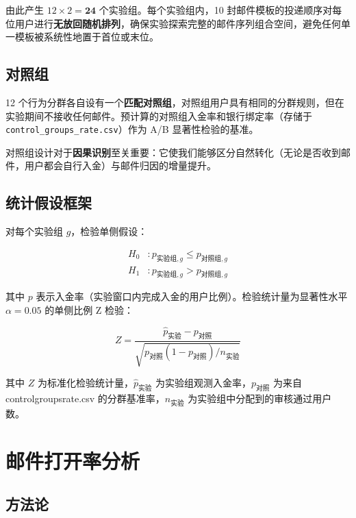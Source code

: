 \documentclass[12pt,a4paper]{ctexart}
\newcommand{\colname}[1]{{\ttfamily\renewcommand{\_}{\textunderscore\allowbreak}#1}}
\begin{document}
由此产生 $12 \times 2 = \mathbf{24}$ 个实验组。每个实验组内，10 封邮件模板的投递顺序对每位用户进行\textbf{无放回随机排列}，确保实验探索完整的邮件序列组合空间，避免任何单一模板被系统性地置于首位或末位。

\subsection{对照组}

12 个行为分群各自设有一个\textbf{匹配对照组}，对照组用户具有相同的分群规则，但在实验期间不接收任何邮件。预计算的对照组入金率和银行绑定率（存储于 \texttt{control\_groups\_rate.csv}）作为 A/B 显著性检验的基准。

对照组设计对于\textbf{因果识别}至关重要：它使我们能够区分自然转化（无论是否收到邮件，用户都会自行入金）与邮件归因的增量提升。

\subsection{统计假设框架}

对每个实验组 $g$，检验单侧假设：

\begin{align}
  H_0 &: p_{\text{实验组},g} \leq p_{\text{对照组},g} \\
  H_1 &: p_{\text{实验组},g} > p_{\text{对照组},g}
\end{align}

其中 $p$ 表示入金率（实验窗口内完成入金的用户比例）。检验统计量为显著性水平 $\alpha = 0.05$ 的单侧比例 Z 检验：

\begin{equation}
  Z = \frac{\hat{p}_{\text{实验}} - p_{\text{对照}}}%
      {\sqrt{p_{\text{对照}}(1 - p_{\text{对照}}) / n_{\text{实验}}}}
\end{equation}

\noindent 其中 $Z$ 为标准化检验统计量，$\hat{p}_{\text{实验}}$ 为实验组观测入金率，$p_{\text{对照}}$ 为来自 \colname{control\_groups\_rate.csv} 的分群基准率，$n_{\text{实验}}$ 为实验组中分配到的审核通过用户数。

\clearpage
\section{邮件打开率分析}

\subsection{方法论}
\end{document}
